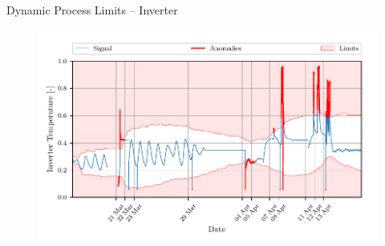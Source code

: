 \documentclass[aspectratio=169]{beamer}
\begin{document}
\begin{frame}{Dynamic Process Limits -- Inverter}
    \begin{figure}[htpb]
        \begin{center}
            \includegraphics[width=0.78\linewidth]{../ilustrate/pc2023/inverter/inverter_thresh.pdf}
        \end{center}
    \end{figure}
\end{frame}
\end{document}
